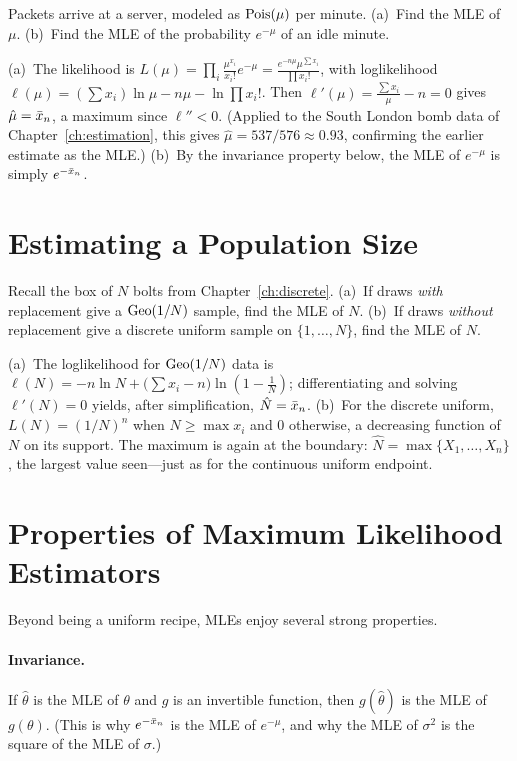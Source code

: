 \begin{example}
Packets arrive at a server, modeled as $\mathrm{Pois}(\mu)$ per minute. (a)~Find the MLE
of $\mu$. (b)~Find the MLE of the probability $e^{-\mu}$ of an idle minute.

\solution (a)~The likelihood is
$L(\mu)=\prod_i \tfrac{\mu^{x_i}}{x_i!}e^{-\mu}=\tfrac{e^{-n\mu}\mu^{\sum x_i}}{\prod x_i!}$,
with loglikelihood $\ell(\mu)=(\sum x_i)\ln\mu - n\mu - \ln\prod x_i!$. Then
$\ell'(\mu)=\tfrac{\sum x_i}{\mu}-n=0$ gives $\hat\mu=\bar{x}_n$, a maximum since
$\ell''<0$. (Applied to the South London bomb data of
Chapter~\ref{ch:estimation}, this gives $\hat\mu=537/576\approx 0.93$, confirming
the earlier estimate as the MLE.) (b)~By the invariance property below, the MLE
of $e^{-\mu}$ is simply $e^{-\bar{x}_n}$.
\end{example}

\section{Estimating a Population Size}

\begin{example}
Recall the box of $N$ bolts from Chapter~\ref{ch:discrete}. (a)~If draws
\emph{with} replacement give a $\mathrm{Geo}(1/N)$ sample, find the MLE of $N$. (b)~If
draws \emph{without} replacement give a discrete uniform sample on
$\{1,\dots,N\}$, find the MLE of $N$.

\solution (a)~The loglikelihood for $\mathrm{Geo}(1/N)$ data is
$\ell(N)=-n\ln N+\bigl(\sum x_i-n\bigr)\ln(1-\tfrac1N)$; differentiating and
solving $\ell'(N)=0$ yields, after simplification, $\hat N=\bar{x}_n$. (b)~For the
discrete uniform, $L(N)=(1/N)^n$ when $N\ge\max x_i$ and $0$ otherwise, a
decreasing function of $N$ on its support. The maximum is again at the boundary:
$\hat N=\max\{X_1,\dots,X_n\}$, the largest value seen—just as for the continuous
uniform endpoint.
\end{example}

\section{Properties of Maximum Likelihood Estimators}

Beyond being a uniform recipe, MLEs enjoy several strong properties.

\paragraph{Invariance.} If $\hat\theta$ is the MLE of $\theta$ and $g$ is an
invertible function, then $g(\hat\theta)$ is the MLE of $g(\theta)$. (This is why
$e^{-\bar{x}_n}$ is the MLE of $e^{-\mu}$, and why the MLE of $\sigma^2$ is the
square of the MLE of $\sigma$.)

